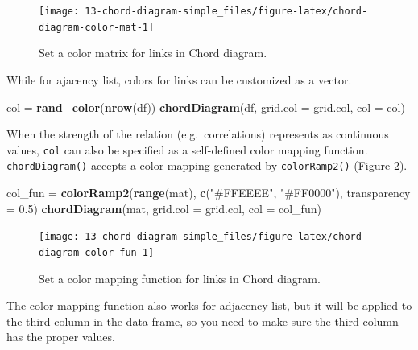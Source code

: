 \documentclass[]{book}
\newenvironment{Shaded}{\begin{snugshade}}{\end{snugshade}}
\newcommand{\KeywordTok}[1]{\textcolor[rgb]{0.13,0.29,0.53}{\textbf{#1}}}
\newcommand{\DataTypeTok}[1]{\textcolor[rgb]{0.13,0.29,0.53}{#1}}
\newcommand{\FloatTok}[1]{\textcolor[rgb]{0.00,0.00,0.81}{#1}}
\newcommand{\StringTok}[1]{\textcolor[rgb]{0.31,0.60,0.02}{#1}}
\newcommand{\NormalTok}[1]{#1}
\begin{document}
\begin{figure}

{\centering \texttt{[image: 13-chord-diagram-simple\_files/figure-latex/chord-diagram-color-mat-1]} 

}

\caption{Set a color matrix for links in Chord diagram.}\label{fig:chord-diagram-color-mat}
\end{figure}

While for ajacency list, colors for links can be customized as a vector.

\begin{Shaded}
\begin{Highlighting}[]
\NormalTok{col =}\StringTok{ }\KeywordTok{rand_color}\NormalTok{(}\KeywordTok{nrow}\NormalTok{(df))}
\KeywordTok{chordDiagram}\NormalTok{(df, }\DataTypeTok{grid.col =}\NormalTok{ grid.col, }\DataTypeTok{col =}\NormalTok{ col)}
\end{Highlighting}
\end{Shaded}

When the strength of the relation (e.g.~correlations) represents as
continuous values, \texttt{col} can also be specified as a self-defined
color mapping function. \texttt{chordDiagram()} accepts a color mapping
generated by \texttt{colorRamp2()} (Figure
\ref{fig:chord-diagram-color-fun}).

\begin{Shaded}
\begin{Highlighting}[]
\NormalTok{col_fun =}\StringTok{ }\KeywordTok{colorRamp2}\NormalTok{(}\KeywordTok{range}\NormalTok{(mat), }\KeywordTok{c}\NormalTok{(}\StringTok{"#FFEEEE"}\NormalTok{, }\StringTok{"#FF0000"}\NormalTok{), }\DataTypeTok{transparency =} \FloatTok{0.5}\NormalTok{)}
\KeywordTok{chordDiagram}\NormalTok{(mat, }\DataTypeTok{grid.col =}\NormalTok{ grid.col, }\DataTypeTok{col =}\NormalTok{ col_fun)}
\end{Highlighting}
\end{Shaded}

\begin{figure}

{\centering \texttt{[image: 13-chord-diagram-simple\_files/figure-latex/chord-diagram-color-fun-1]} 

}

\caption{Set a color mapping function for links in Chord diagram.}\label{fig:chord-diagram-color-fun}
\end{figure}

The color mapping function also works for adjacency list, but it will be
applied to the third column in the data frame, so you need to make sure
the third column has the proper values.
\end{document}
